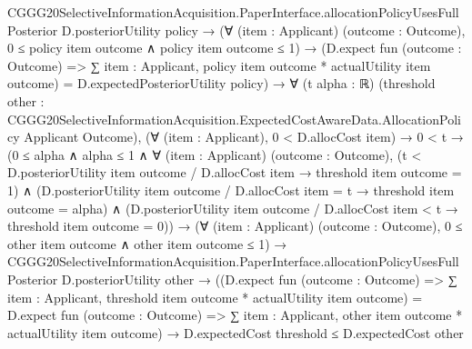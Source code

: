 \documentclass[10pt]{article}
\begin{document}
\begin{ReviewVerbatim}
        CGGG20SelectiveInformationAcquisition.PaperInterface.allocationPolicyUsesFullPosterior D.posteriorUtility
            policy →
          (∀ (item : Applicant) (outcome : Outcome), 0 ≤ policy item outcome ∧ policy item outcome ≤ 1) →
            (D.expect fun (outcome : Outcome) => ∑ item : Applicant, policy item outcome * actualUtility item outcome) =
              D.expectedPosteriorUtility policy) →
      ∀ (t alpha : ℝ)
        (threshold other :
          CGGG20SelectiveInformationAcquisition.ExpectedCostAwareData.AllocationPolicy Applicant Outcome),
        (∀ (item : Applicant), 0 < D.allocCost item) →
          0 < t →
            (0 ≤ alpha ∧
                alpha ≤ 1 ∧
                  ∀ (item : Applicant) (outcome : Outcome),
                    (t < D.posteriorUtility item outcome / D.allocCost item → threshold item outcome = 1) ∧
                      (D.posteriorUtility item outcome / D.allocCost item = t → threshold item outcome = alpha) ∧
                        (D.posteriorUtility item outcome / D.allocCost item < t → threshold item outcome = 0)) →
              (∀ (item : Applicant) (outcome : Outcome), 0 ≤ other item outcome ∧ other item outcome ≤ 1) →
                CGGG20SelectiveInformationAcquisition.PaperInterface.allocationPolicyUsesFullPosterior
                    D.posteriorUtility other →
                  ((D.expect fun (outcome : Outcome) =>
                        ∑ item : Applicant, threshold item outcome * actualUtility item outcome) =
                      D.expect fun (outcome : Outcome) =>
                        ∑ item : Applicant, other item outcome * actualUtility item outcome) →
                    D.expectedCost threshold ≤ D.expectedCost other
\end{ReviewVerbatim}
\end{document}
